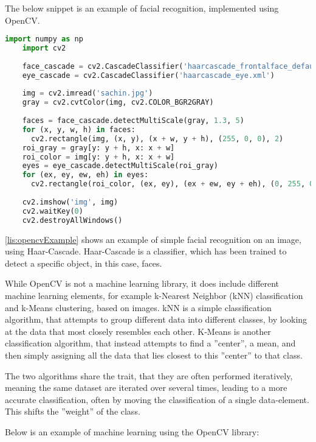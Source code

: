 The below snippet is an example of facial recognition, implemented using OpenCV.
\begin{lstlisting}[language=Python,label=lis:opencvExample,caption=Source code from the OpenCV documentation\cite{opencvHaarExample}.]
	import numpy as np
	import cv2
	
	face_cascade = cv2.CascadeClassifier('haarcascade_frontalface_default.xml')
	eye_cascade = cv2.CascadeClassifier('haarcascade_eye.xml')
	
	img = cv2.imread('sachin.jpg')
	gray = cv2.cvtColor(img, cv2.COLOR_BGR2GRAY)
	
	faces = face_cascade.detectMultiScale(gray, 1.3, 5)
	for (x, y, w, h) in faces:
	  cv2.rectangle(img, (x, y), (x + w, y + h), (255, 0, 0), 2)
	roi_gray = gray[y: y + h, x: x + w]
	roi_color = img[y: y + h, x: x + w]
	eyes = eye_cascade.detectMultiScale(roi_gray)
	for (ex, ey, ew, eh) in eyes:
	  cv2.rectangle(roi_color, (ex, ey), (ex + ew, ey + eh), (0, 255, 0), 2)
	
	cv2.imshow('img', img)
	cv2.waitKey(0)
	cv2.destroyAllWindows()
\end{lstlisting}
\autoref{lis:opencvExample} shows an example of simple facial recognition on an image, using Haar-Cascade.
Haar-Cascade is a classifier, which has been trained to detect a specific object, in this case, faces.

While OpenCV is not a machine learning library, it does include different machine learning elements, for example k-Nearest Neighbor (kNN) classification and k-Means clustering, based on images.
kNN is a simple classification algorithm, that attempts to group different data into different classes, by looking at the data that most closely resembles each other.
K-Means is another classification algorithm, that instead attempts to find a ''center'', a mean, and then simply assigning all the data that lies closest to this ''center'' to that class.

The two algorithms share the trait, that they are often performed iteratively, meaning the same dataset are iterated over several times, leading to a more accurate classification, often by moving the classification of a single data-element.
This shifts the ''weight'' of the class.

Below is an example of machine learning using the OpenCV library:

